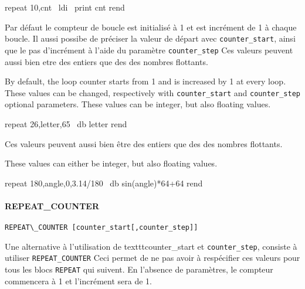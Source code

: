 \begin{code}
repeat 10,cnt
\ ldi
\ print cnt
rend
\end{code}

\begin{xfr}
Par défaut le compteur de boucle est initialisé à 1 et est incrément de 1 à chaque boucle.
Il aussi possibe de préciser la valeur de départ avec \texttt{counter\_start}, ainsi que le pas d'incrément à l'aide du paramètre \texttt{counter\_step}
Ces valeurs peuvent aussi bien etre des entiers que des des nombres flottants.
\end{xfr}

\begin{xen}
By default, the loop counter starts from 1 and is increased by 1 at every loop. 
These values can be changed, respectively with \texttt{counter\_start} and \texttt{counter\_step} optional parameters.
These values can be integer, but also floating values.
\end{xen}

\begin{code}
repeat 26,letter,65
\ db letter
rend
\end{code}

\begin{xfr}
Ces valeurs peuvent aussi bien être des entiers que des des nombres flottants.
\end{xfr}

\begin{xen}
These values can either be integer, but also floating values.
\end{xen}

\begin{code}
repeat 180,angle,0,3.14/180
\ db sin(angle)*64+64
rend
\end{code}
    

\paragraph{REPEAT\_COUNTER}

\begin{verbatim}
REPEAT\_COUNTER [counter_start[,counter_step]]
\end{verbatim}
    
\begin{xfr}
Une alternative à l'utilisation de texttt{counter\_start} et \texttt{counter\_step}, consiste à utiliser  \texttt{REPEAT\_COUNTER}
Ceci permet de ne pas avoir à respécifier ces valeurs pour tous les blocs \texttt{REPEAT} qui suivent.
En l'absence de paramètres, le compteur commencera à 1 et l'incrément sera de 1.
\end{xfr}

